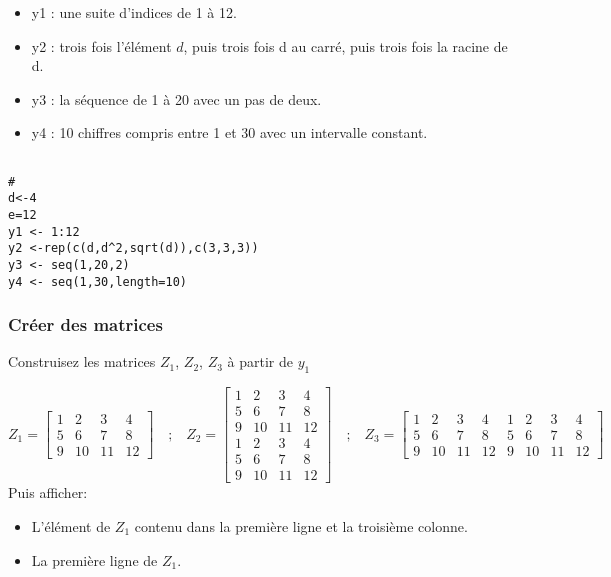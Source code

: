 \documentclass[12pt,twoside,openright]{article}
\begin{document}
\begin{itemize}
\item y1 : une suite d'indices de 1 à 12.
\item y2 : trois fois l'élément $d$, puis trois fois d au carré, puis trois fois la racine de d.
\item y3 : la séquence de 1 à 20 avec un pas de deux.
\item y4 : 10 chiffres compris entre 1 et 30 avec un intervalle constant.
\end{itemize}
%
\begin{verbatim}

#
d<-4
e=12
y1 <- 1:12
y2 <-rep(c(d,d^2,sqrt(d)),c(3,3,3))
y3 <- seq(1,20,2)
y4 <- seq(1,30,length=10)

\end{verbatim}
%
\subsubsection{Créer des matrices}
Construisez les matrices $Z_1$, $Z_2$, $Z_3$ à partir de $y_1$

$$ Z_1=\left[\begin{array}{cccc}
1 & 2 & 3& 4\\
5 & 6 & 7 & 8\\
9 & 10 & 11 & 12
\end{array}\right] \quad \mbox{;} \quad Z_2=\left[\begin{array}{cccc}
1 & 2 & 3& 4\\
5 & 6 & 7 & 8\\
9 & 10 & 11 & 12\\
1 & 2 & 3& 4\\
5 & 6 & 7 & 8\\
9 & 10 & 11 & 12
\end{array}\right]
\quad \mbox{;} \quad 
Z_3=\left[\begin{array}{cccccccc}
1 & 2 & 3& 4 &1 & 2 & 3& 4\\
5 & 6 & 7 & 8 &5 & 6 & 7 & 8\\
9 & 10 & 11 & 12 & 9 & 10 & 11 & 12
\end{array}\right]
$$
Puis afficher:
\begin{itemize}
\item L'élément de $Z_1$ contenu dans la première ligne et la troisième colonne.
\item La première ligne de $Z_1$.
\end{itemize}
\end{document}
